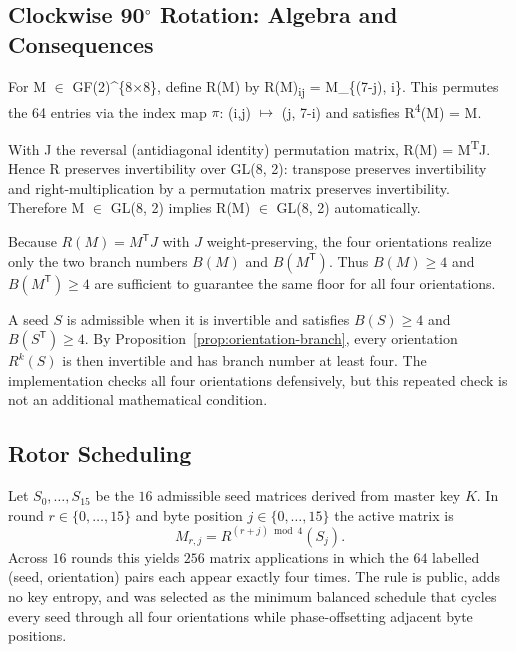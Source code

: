 \documentclass[cryptography,article,submit,oneauthor]{Definitions/mdpi}
\newcommand{\T}{\mathsf{T}}
\begin{document}
\subsection[Clockwise 90-degree Rotation: Algebra and Consequences]{Clockwise 90\ensuremath{^\circ} Rotation: Algebra and Consequences}\label{sec:3-4}
For M \ensuremath{\in} GF(2)\textasciicircum{}\{8\ensuremath{\times}8\}, define R(M) by R(M)\textsubscript{i}\textsubscript{j} = M\_\{(7-j), i\}. This permutes the 64 entries via the index map \ensuremath{\pi}: (i,j) \ensuremath{\mapsto} (j, 7-i) and satisfies R\textsuperscript{4}(M) = M.\par
\begin{Proposition}
With J the reversal (antidiagonal identity) permutation matrix, R(M) = M\textsuperscript{T}J. Hence R preserves invertibility over GL(8, 2): transpose preserves invertibility and right-multiplication by a permutation matrix preserves invertibility. Therefore M \ensuremath{\in} GL(8, 2) implies R(M) \ensuremath{\in} GL(8, 2) automatically. 
\end{Proposition}

\begin{Proposition}\label{prop:orientation-branch}
Because $R(M)=M^{\T}J$ with $J$ weight-preserving, the four orientations realize only the two branch numbers $B(M)$ and $B(M^{\T})$. Thus $B(M)\geq4$ and $B(M^{\T})\geq4$ are sufficient to guarantee the same floor for all four orientations.
\end{Proposition}
\begin{Definition}
A seed $S$ is admissible when it is invertible and satisfies $B(S)\geq4$ and $B(S^{\T})\geq4$. By Proposition~\ref{prop:orientation-branch}, every orientation $R^k(S)$ is then invertible and has branch number at least four. The implementation checks all four orientations defensively, but this repeated check is not an additional mathematical condition.
\end{Definition}

\subsection{Rotor Scheduling}\label{sec:3-5}

Let $S_0,\dots,S_{15}$ be the $16$ admissible seed matrices derived from master key
$K$. In round $r \in \{0,\dots,15\}$ and byte position $j \in \{0,\dots,15\}$ the
active matrix is
\begin{equation}\label{eq:schedule}
M_{r,j} = R^{(r+j) \bmod 4}(S_j).
\end{equation}
Across $16$ rounds this yields $256$ matrix applications in which the $64$ labelled
(seed, orientation) pairs each appear exactly four times. The rule is public, adds no
key entropy, and was selected as the minimum balanced schedule that cycles every seed
through all four orientations while phase-offsetting adjacent byte positions.
\end{document}
